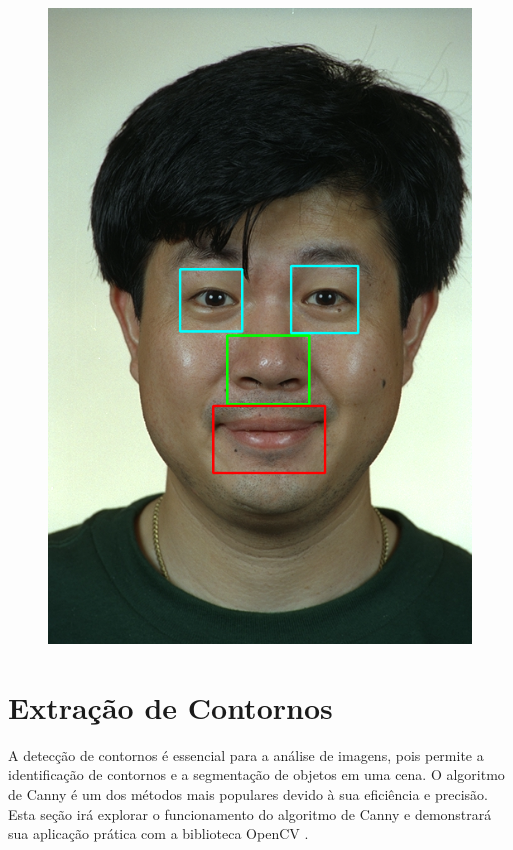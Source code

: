 \begin{figure}[h!]
    \begin{minipage}[b]{0.45\textwidth}
        \centering
        \includegraphics[width=0.9\linewidth]{fig/02_detected_features.png}
        \label{fig:caracteristicas}
    \end{minipage}
    \label{fig:deteccao-caracteristicas}
\end{figure}



\section{Extração de Contornos}

A detecção de contornos é essencial para a análise de imagens, pois permite a identificação de contornos e a segmentação de objetos em uma cena. O algoritmo de Canny \cite{Canny} é um dos métodos mais populares devido à sua eficiência e precisão. Esta seção irá explorar o funcionamento do algoritmo de Canny e demonstrará sua aplicação prática com a biblioteca OpenCV \cite{CannyAplicacao}.

